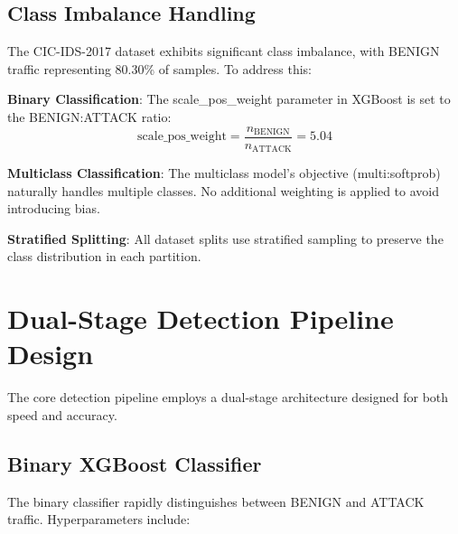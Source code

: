 \documentclass[12pt,a4paper]{report}
\begin{document}
\subsection{Class Imbalance Handling}

The CIC-IDS-2017 dataset exhibits significant class imbalance, with BENIGN traffic representing 80.30\% of samples. To address this:

\textbf{Binary Classification}: The scale\_pos\_weight parameter in XGBoost is set to the BENIGN:ATTACK ratio:
\begin{equation}
\text{scale\_pos\_weight} = \frac{n_{\text{BENIGN}}}{n_{\text{ATTACK}}} = 5.04
\end{equation}

\textbf{Multiclass Classification}: The multiclass model's objective (multi:softprob) naturally handles multiple classes. No additional weighting is applied to avoid introducing bias.

\textbf{Stratified Splitting}: All dataset splits use stratified sampling to preserve the class distribution in each partition.

\section{Dual-Stage Detection Pipeline Design}

The core detection pipeline employs a dual-stage architecture designed for both speed and accuracy.

\subsection{Binary XGBoost Classifier}

The binary classifier rapidly distinguishes between BENIGN and ATTACK traffic. Hyperparameters include:
\end{document}
